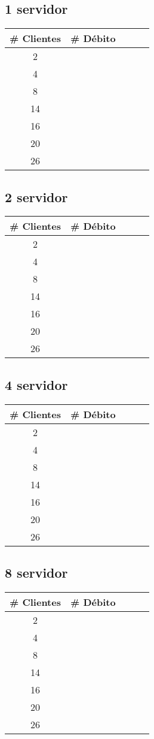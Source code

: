 \subsection{1 servidor}
\begin{tabular}{|c|c|c|c|c|}
\hline
\textbf{\# Clientes} & \textbf{\# Débito} \\ \hline
2 &  \\ \hline
4 &  \\ \hline
8 &  \\ \hline
14 &  \\ \hline
16 &  \\ \hline
20 &  \\ \hline
26 &  \\ \hline
\end{tabular}

\subsection{2 servidor}
\begin{tabular}{|c|c|c|c|c|}
\hline
\textbf{\# Clientes} & \textbf{\# Débito} \\ \hline
2 &  \\ \hline
4 &  \\ \hline
8 &  \\ \hline
14 &  \\ \hline
16 &  \\ \hline
20 &  \\ \hline
26 &  \\ \hline
\end{tabular}

\subsection{4 servidor}
\begin{tabular}{|c|c|c|c|c|}
\hline
\textbf{\# Clientes} & \textbf{\# Débito} \\ \hline
2 &  \\ \hline
4 &  \\ \hline
8 &  \\ \hline
14 &  \\ \hline
16 &  \\ \hline
20 &  \\ \hline
26 &  \\ \hline
\end{tabular}

\subsection{8 servidor}
\begin{tabular}{|c|c|c|c|c|}
\hline
\textbf{\# Clientes} & \textbf{\# Débito} \\ \hline
2 &  \\ \hline
4 &  \\ \hline
8 &  \\ \hline
14 &  \\ \hline
16 &  \\ \hline
20 &  \\ \hline
26 &  \\ \hline
\end{tabular}
